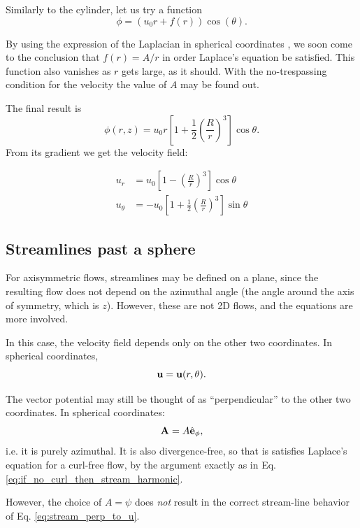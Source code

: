 Similarly to the cylinder, let us try a function
\[
\phi =  \left( u_0 r  + f(r) \right) \cos(\theta)  .
\]

By using the expression of the Laplacian in spherical coordinates
\cite{wiki:del}, we soon come to the conclusion that $f(r)= A/r $ in
order Laplace's equation be satisfied. This function also vanishes as
$r$ gets large, as it should. With the no-trespassing condition for the
velocity the value of $A$ may be found out.

The final result is
\[
  \phi(r,z) = u_0 r
  \left[
    1 +
    \frac12 \left( \frac{R}{r}\right)^3
  \right] \cos\theta .
\]
From its gradient we get the velocity field:

\begin{align*}
u_r &=  u_0
  \left[
    1 -
      \left(\frac{R}{r}\right)^3
  \right] \cos\theta \\
u_\theta &=  -u_0
  \left[
    1 + \frac12
      \left(\frac{R}{r}\right)^3
  \right] \sin\theta
\end{align*}


\subsection{Streamlines past a sphere}

For axisymmetric flows, streamlines may be defined on a plane, since
the resulting flow does not depend on the azimuthal angle (the angle
around the axis of symmetry, which is $z$). However, these are not 2D
flows, and the equations are more involved.

In this case, the velocity field depends only on the other two
coordinates. In spherical coordinates,
\[
  \mathbf{u} = \mathbf{u}(r,\theta) .
\]

The vector potential may still be thought of as ``perpendicular'' to the other
two coordinates. In spherical coordinates:
\[
  \mathbf{A} = A \hat{\mathbf{e}}_\phi ,
\]
i.e. it is purely azimuthal. It is also divergence-free, so that is
satisfies Laplace's equation for a curl-free flow, by the argument
exactly as in Eq. \ref{eq:if_no_curl_then_stream_harmonic}.

However, the choice of $A=\psi$ does \emph{not} result in the correct
stream-line behavior of Eq.  \ref{eq:stream_perp_to_u}.

